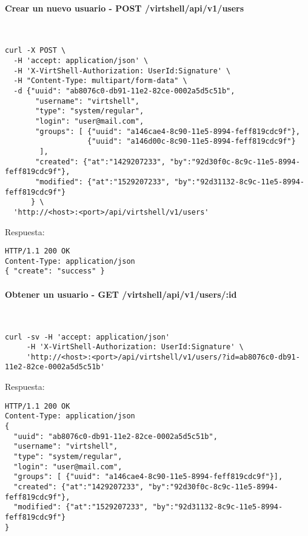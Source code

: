 \paragraph{Crear un nuevo usuario - POST /virtshell/api/v1/users} ~\\

\begin{lstlisting}[style=json]
curl -X POST \
  -H 'accept: application/json' \
  -H 'X-VirtShell-Authorization: UserId:Signature' \
  -H "Content-Type: multipart/form-data" \
  -d {"uuid": "ab8076c0-db91-11e2-82ce-0002a5d5c51b",
       "username": "virtshell", 
       "type": "system/regular",
       "login": "user@mail.com",
       "groups": [ {"uuid": "a146cae4-8c90-11e5-8994-feff819cdc9f"},
                   {"uuid": "a146d00c-8c90-11e5-8994-feff819cdc9f"}
        ],
       "created": {"at":"1429207233", "by":"92d30f0c-8c9c-11e5-8994-feff819cdc9f"},
       "modified": {"at":"1529207233", "by":"92d31132-8c9c-11e5-8994-feff819cdc9f"}
      } \
  'http://<host>:<port>/api/virtshell/v1/users'
\end{lstlisting}

\vspace{1cm}
Respuesta:
\vspace{1cm}

\begin{lstlisting}[style=json]
HTTP/1.1 200 OK
Content-Type: application/json
{ "create": "success" }
\end{lstlisting}

\paragraph{Obtener un usuario - GET /virtshell/api/v1/users/:id} ~\\

\begin{lstlisting}[style=json]
curl -sv -H 'accept: application/json' 
     -H 'X-VirtShell-Authorization: UserId:Signature' \ 
     'http://<host>:<port>/api/virtshell/v1/users/?id=ab8076c0-db91-11e2-82ce-0002a5d5c51b'
\end{lstlisting}

\vspace{1cm}
Respuesta:
\vspace{1cm}

\begin{lstlisting}[style=json]
HTTP/1.1 200 OK
Content-Type: application/json
{
  "uuid": "ab8076c0-db91-11e2-82ce-0002a5d5c51b",
  "username": "virtshell",
  "type": "system/regular",
  "login": "user@mail.com",
  "groups": [ {"uuid": "a146cae4-8c90-11e5-8994-feff819cdc9f"}],
  "created": {"at":"1429207233", "by":"92d30f0c-8c9c-11e5-8994-feff819cdc9f"},
  "modified": {"at":"1529207233", "by":"92d31132-8c9c-11e5-8994-feff819cdc9f"}
}
\end{lstlisting}


